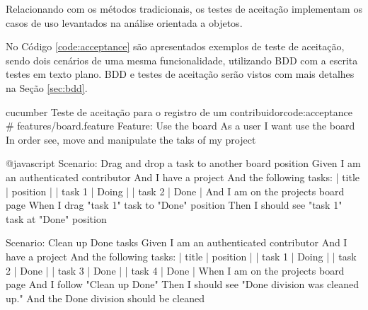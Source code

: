 Relacionando com os métodos tradicionais, os testes de aceitação implementam os casos de uso levantados na análise orientada a objetos.

No Código \ref{code:acceptance} são apresentados exemplos de teste de aceitação, sendo dois cenários de uma mesma funcionalidade, utilizando BDD com a escrita testes em texto plano. BDD e testes de aceitação serão vistos com mais detalhes na Seção \ref{sec:bdd}.

\begin{mycode}{cucumber}%
{Teste de aceitação para o registro de um contribuidor}{code:acceptance}
# features/board.feature
Feature: Use the board
  As a user
  I want use the board
  In order see, move and manipulate the taks of my project

  @javascript
  Scenario: Drag and drop a task to another board position
    Given I am an authenticated contributor
    And I have a project
    And the following tasks:
      | title  | position |
      | task 1 | Doing    |
      | task 2 | Done     |
    And I am on the projects board page
    When I drag "task 1" task to "Done" position
    Then I should see "task 1" task at "Done" position

  Scenario: Clean up Done tasks
    Given I am an authenticated contributor
    And I have a project
    And the following tasks:
      | title  | position |
      | task 1 | Doing    |
      | task 2 | Done     |
      | task 3 | Done     |
      | task 4 | Done     |
    When I am on the projects board page
    And I follow "Clean up Done"
    Then I should see "Done division was cleaned up."
    And the Done division should be cleaned
\end{mycode}



